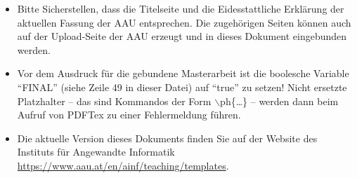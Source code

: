 \documentclass[11pt,twoside,openright,english]{klureport}
\begin{document}
{{\begin{itemize}
\begin{itemize}
			\end{itemize}
			\item Bitte Sicherstellen, dass die Titelseite und die Eidesstattliche Erklärung der aktuellen Fassung der AAU entsprechen. Die zugehörigen Seiten können auch auf der Upload-Seite der AAU erzeugt und in dieses Dokument eingebunden werden.
			\item Vor dem Ausdruck für die gebundene Masterarbeit ist die boolesche Variable ``FINAL'' (siehe Zeile 49 in dieser Datei)
			auf ``true'' zu setzen! Nicht ersetzte Platzhalter -- das sind Kommandos der Form $\backslash$ph\{\ldots\} -- werden dann beim Aufruf von PDFTex zu einer Fehlermeldung führen.
			\item Die aktuelle Version dieses Dokuments finden Sie auf der Website des Instituts für Angewandte Informatik \url{https://www.aau.at/en/ainf/teaching/templates}.
		\end{itemize}
}}

\newtableofcontents

\mainmatter   %








%
%

%

%

%
%
\appendix
\end{document}
